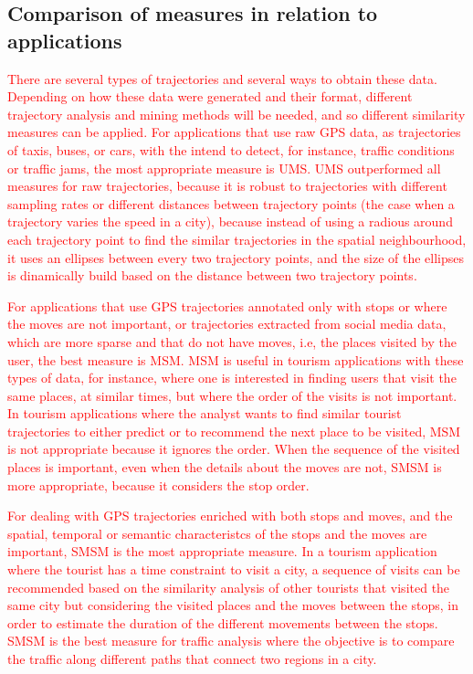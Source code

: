 \documentclass[12pt]{article}
\begin{document}
\subsection{Comparison of measures in relation to applications}
\textcolor{red}{There are several types of trajectories and several ways to obtain these data. Depending on how these data were generated and their format, different  trajectory analysis and mining methods will be needed, and so different similarity measures can be applied. For applications that use raw GPS data, as trajectories of taxis, buses, or cars, with the intend to detect, for instance, traffic conditions or traffic jams, the most appropriate measure is UMS. UMS outperformed all measures for raw trajectories, because it is robust to trajectories with different sampling rates or different distances between trajectory points (the case when a trajectory varies the speed in a city), because instead of using a radious around each trajectory point to find the similar trajectories in the spatial neighbourhood, it uses an ellipses between every two trajectory points, and the size of the ellipses is dinamically build based on the distance between two trajectory points.}

\textcolor{red}{For applications that use GPS trajectories annotated only with stops or where the moves are not important, or trajectories extracted from social media data, which are more sparse and that do not have moves, i.e, the places visited by the user, the best measure is MSM. MSM is useful in tourism applications with these types of data, for instance, where one is interested in finding users that visit the same places, at similar times, but where the order of the visits is not important. In tourism applications where the analyst wants to find similar tourist trajectories to either predict or to recommend the next place to be visited, MSM is not appropriate because it ignores the order. When the sequence of the visited places is important, even when the details about the moves are not, SMSM is more appropriate, because it considers the stop order.}

\textcolor{red}{For dealing with GPS trajectories enriched with both stops and moves, and the spatial, temporal or semantic characteristcs of the stops and the moves are important, SMSM is the most appropriate measure. In a tourism application where the tourist has a time constraint to visit a city, a sequence of visits can be recommended based on the similarity analysis of other tourists that visited the same city but considering the visited places and the moves between the stops, in order to estimate the duration of the different movements between the stops. SMSM is the best measure for traffic analysis where the objective is to compare the traffic along  different paths that connect two regions in a city.}
\end{document}
